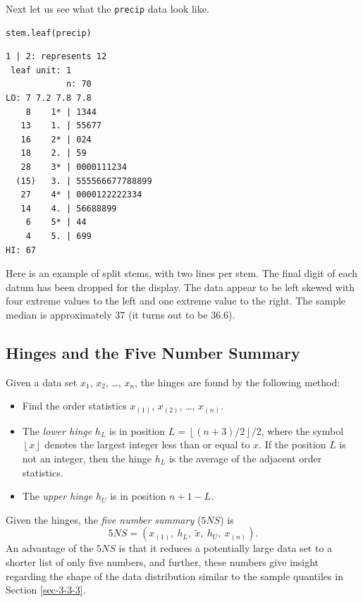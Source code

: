\documentclass[captions=tableheading]{scrbook}
\begin{document}
Next let us see what the \texttt{precip} data look like.


\lstset{language=R}
\begin{lstlisting}
stem.leaf(precip)
\end{lstlisting}


\begin{verbatim}
1 | 2: represents 12
 leaf unit: 1
            n: 70
LO: 7 7.2 7.8 7.8
    8    1* | 1344
   13    1. | 55677
   16    2* | 024
   18    2. | 59
   28    3* | 0000111234
  (15)   3. | 555566677788899
   27    4* | 0000122222334
   14    4. | 56688899
    6    5* | 44
    4    5. | 699
HI: 67
\end{verbatim}

Here is an example of split stems, with two lines per stem. The final digit of each datum has been dropped for the display. The data appear to be left skewed with four extreme values to the left and one extreme value to the right. The sample median is approximately 37 (it turns out to be 36.6).
\subsection{Hinges and the Five Number Summary}
\label{sec-3-4-2}
\label{sub-hinges-and-5NS}


Given a data set \(x_{1}\), \(x_{2}\), \ldots{}, \(x_{n}\), the hinges are found by the following method:  
\begin{itemize}
\item Find the order statistics \(x_{(1)}\), \(x_{(2)}\), \ldots{}, \(x_{(n)}\).
\item The \emph{lower hinge} \(h_{L}\) is in position \(L=\left\lfloor (n+3)/2\right\rfloor / 2\), where the symbol \( \left\lfloor x\right\rfloor \) denotes the largest integer less than or equal to \(x\). If the position \(L\) is not an integer, then the hinge \(h_{L}\) is the average of the adjacent order statistics.
\item The \emph{upper hinge} \(h_{U}\) is in position \(n+1-L\).
\end{itemize}
Given the hinges, the \emph{five number summary} (\(5NS\)) is 
\begin{equation} 
5NS=(x_{(1)},\ h_{L},\ \tilde{x},\ h_{U},\ x_{(n)}).
\end{equation}
An advantage of the \(5NS\) is that it reduces a potentially large data set to a shorter list of only five numbers, and further, these numbers give insight regarding the shape of the data distribution similar to the sample quantiles in Section \ref{sec-3-3-3}.
\end{document}
